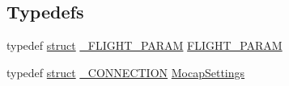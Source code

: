 \subsection*{Typedefs}
\begin{DoxyCompactItemize}
\item 
typedef \hyperlink{sdlgamepad_8dox_aba655c5729da86df745f0c8e7f9ba8d2}{struct} \hyperlink{struct___f_l_i_g_h_t___p_a_r_a_m}{\-\_\-\-F\-L\-I\-G\-H\-T\-\_\-\-P\-A\-R\-A\-M} \hyperlink{group___mo_cap_plugin_ga7bda7a22b899fe8dff0ba9a0cae99da6}{F\-L\-I\-G\-H\-T\-\_\-\-P\-A\-R\-A\-M}
\item 
typedef \hyperlink{sdlgamepad_8dox_aba655c5729da86df745f0c8e7f9ba8d2}{struct} \hyperlink{struct___c_o_n_n_e_c_t_i_o_n}{\-\_\-\-C\-O\-N\-N\-E\-C\-T\-I\-O\-N} \hyperlink{group___mo_cap_plugin_ga6083347a5b3eb70e360f599354dc0f0b}{Mocap\-Settings}
\end{DoxyCompactItemize}

